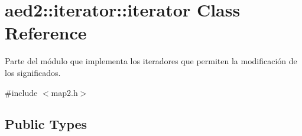 \hypertarget{classaed2_1_1iterator_1_1iterator}{}\section{aed2\+:\+:iterator\+:\+:iterator Class Reference}
\label{classaed2_1_1iterator_1_1iterator}


Parte del módulo que implementa los iteradores que permiten la modificación de los significados.  




{\ttfamily \#include $<$map2.\+h$>$}

\subsection*{Public Types}
